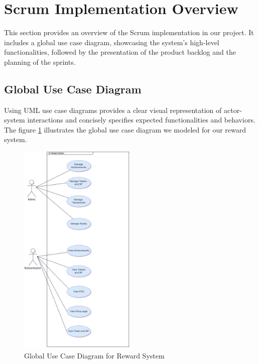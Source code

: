 \section{Scrum Implementation Overview}
This section provides an overview of the Scrum implementation in our project. It includes a global use case diagram, showcasing the system’s high-level functionalities, followed by the presentation of the product backlog and the planning of the sprints.

\subsection{Global Use Case Diagram}
Using UML use case diagrams provides a clear visual representation of actor-system interactions and concisely specifies expected functionalities and behaviors. The figure \ref{fig:global_use_case} illustrates the global use case diagram we modeled for our reward system.

\begin{figure}[H]
    \centering
    \includegraphics[width=0.5\textwidth]{src/assets/diagrams/GlobalUseCaseUC.png}
    \caption{Global Use Case Diagram for Reward System}
    \label{fig:global_use_case}
\end{figure}

